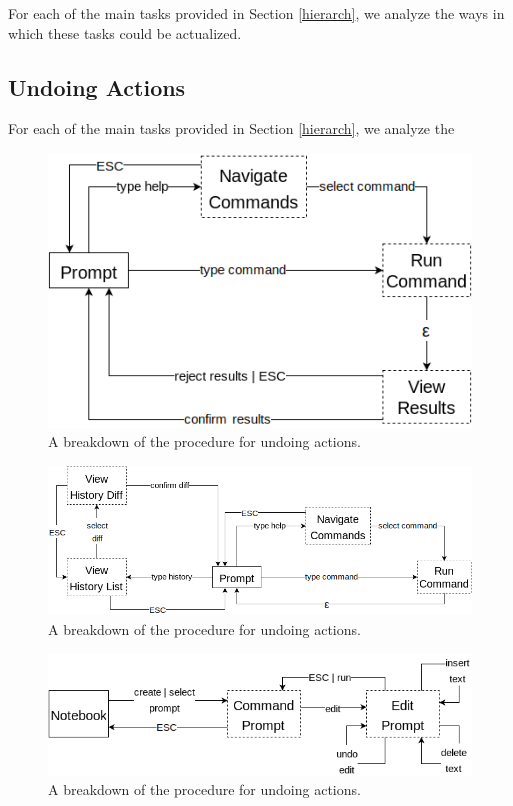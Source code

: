 For each of the main tasks provided in Section \ref{hierarch}, we analyze the
ways in which these tasks could be actualized.

\subsection{Undoing Actions}

For each of the main tasks provided in Section \ref{hierarch}, we analyze the
\begin{figure}[H]
  \centering
  \includegraphics[width=0.8\linewidth]{figures/alternatives/undo_a.png}
  \caption{A breakdown of the procedure for undoing actions.}
  \label{fig:undoa}
\end{figure}

\begin{figure}[H]
  \centering
  \includegraphics[width=0.8\linewidth]{figures/alternatives/undo_b.png}
  \caption{A breakdown of the procedure for undoing actions.}
  \label{fig:undob}
\end{figure}

\begin{figure}[H]
  \centering
  \includegraphics[width=0.8\linewidth]{figures/alternatives/undo_c.png}
  \caption{A breakdown of the procedure for undoing actions.}
  \label{fig:undoc}
\end{figure}

